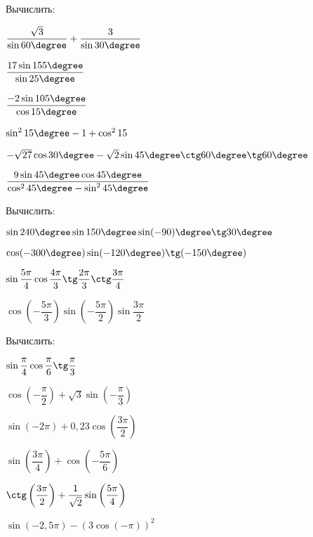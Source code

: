 %
%
\begin{class}[number=6]
	\begin{listofex}
		\item Вычислить:
		\begin{enumcols}[itemcolumns=2]
			\item \( \dfrac{\sqrt{3}}{\sin60\degree}+\dfrac{3}{\sin30\degree} \)
			\item \( \dfrac{17\sin155\degree}{\sin25\degree} \)
			\item \( \dfrac{-2\sin105\degree}{\cos15\degree} \)
			\item \( \sin^215\degree-1+\cos^215 \)
			\item \( -\sqrt{27}\cos30\degree-\sqrt{2}\sin45\degree\ctg60\degree\tg60\degree\)
			\item \( \dfrac{9\sin45\degree\cos45\degree}{\cos^245\degree-\sin^245\degree} \)
		\end{enumcols}
		\item Вычислить:
		\begin{enumcols}[itemcolumns=2]
			\item \( \sin240\degree\sin150\degree\sin(-90)\degree\tg30\degree \)
			\item \( \cos(-300\degree)\sin(-120\degree)\tg(-150\degree) \)
			\item \( \sin\dfrac{5\pi}{4}\cos\dfrac{4\pi}{3}\tg\dfrac{2\pi}{3}\ctg\dfrac{3\pi}{4} \)
			\item \( \cos\left( -\dfrac{5\pi}{3} \right)\sin\left( -\dfrac{5\pi}{2} \right)\sin\dfrac{3\pi}{2} \)
		\end{enumcols}
		\item Вычислить:
		\begin{enumcols}[itemcolumns=2]
			\item \( \sin\dfrac{\pi}{4}\cos\dfrac{\pi}{6}\tg\dfrac{\pi}{3} \)
			\item \( \cos\left( -\dfrac{\pi}{2} \right)+\sqrt{3}\sin\left( -\dfrac{\pi}{3} \right) \)
			\item \( \sin(-2\pi)+0,23\cos\left( \dfrac{3\pi}{2} \right) \)
			\item \( \sin\left( \dfrac{3\pi}{4} \right)+\cos\left( -\dfrac{5\pi}{6} \right) \)
			\item \( \ctg\left( \dfrac{3\pi}{2} \right)+\dfrac{1}{\sqrt{2}}\sin\left( \dfrac{5\pi}{4} \right) \)
			\item \( \sin(-2,5\pi)-(3\cos(-\pi))^2 \)

\end{enumcols}
\end{listofex}
\end{class}
